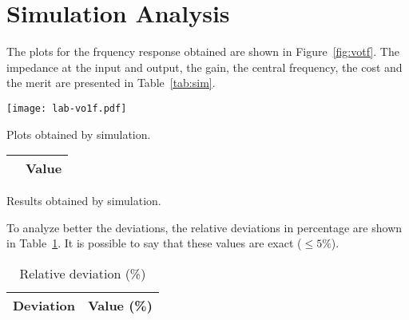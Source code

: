 \section{Simulation Analysis}
\label{sec:simulation}


The plots for the frquency response obtained are shown in Figure~\ref{fig:votf}.
The impedance at the input and output, the gain, the central frequency,
the cost and the merit are presented in Table~\ref{tab:sim}.\\

\begin{minipage}[b]{0.49\textwidth}
  \centering
  \texttt{[image: lab-vo1f.pdf]}
  \captionsetup{type=figure}
  \caption{Plots obtained by simulation.}
  \label{fig:votf}  
\end{minipage}
\hfill
\begin{minipage}[b]{0.49\textwidth}
  \centering
  \begin{tabular}{|c|c|}
      \hline
       & \textbf{Value} \\ \hline
      
      
      
  \end{tabular}
  \captionsetup{type=table}
  \caption{Results obtained by simulation.}
  \label{tab:sim}
\end{minipage}


To analyze better the deviations, the relative deviations in percentage are shown in Table~\ref{tab:perc}. It is possible to say that these values are exact ($\leq 5\%$).

\begin{table}[ht!]
  \centering
  \begin{tabular}{|c|c|}
    \hline
    \textbf{Deviation} & \textbf{Value} (\%) \\ \hline
    
  \end{tabular}
  \caption{Relative deviation (\%)}
  \label{tab:perc}
\end{table}
